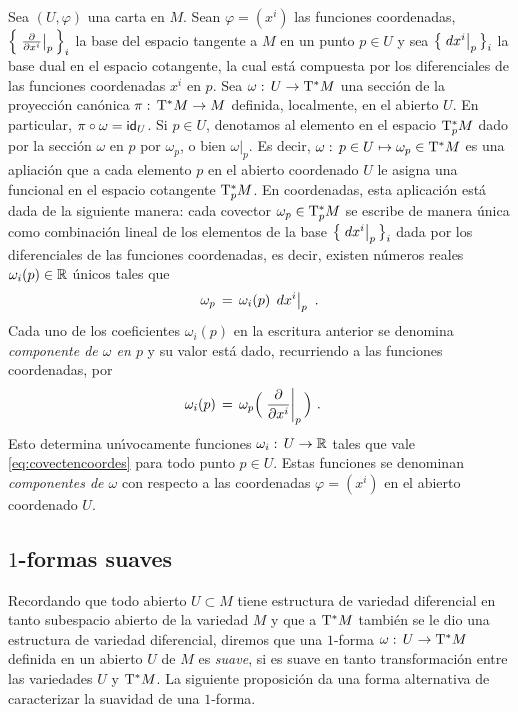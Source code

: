 Sea $(U,\varphi)$ una carta en $M$. Sean $\varphi=(x^{i})$ las funciones
coordenadas, $\Big\{\gancho[p]{x^{i}}\Big\}_{i}$ la base del espacio tangente
a $M$ en un punto $p\in U$ y sea $\big\{\de[p]{x^{i}}\big\}_{i}$ la base
dual en el espacio cotangente, la cual est\'{a} compuesta por los
diferenciales de las funciones coordenadas $x^{i}$ en $p$. Sea
$\omega:\,U\rightarrow\tangente*{M}$ una secci\'{o}n de la proyecci\'{o}n
can\'{o}nica $\pi:\,\tangente*{M}\rightarrow M$ definida, localmente,
en el abierto $U$. En particular, $\pi\circ\omega=\id[U]$. Si $p\in U$,
denotamos al elemento en el espacio $\tangente*[p]{M}$ dado por la
secci\'{o}n $\omega$ en $p$ por $\omega_{p}$, o bien $\omega|_{p}$.
Es decir, $\omega:\,p\in U\mapsto\omega_{p}\in\tangente*{M}$ es una
apliaci\'{o}n que a cada elemento $p$ en el abierto coordenado $U$ le
asigna una funcional en el espacio cotangente $\tangente*[p]{M}$.
En coordenadas, esta aplicaci\'{o}n est\'{a} dada de la siguiente manera:
cada covector $\omega_{p}\in\tangente*[p]{M}$ se escribe de manera \'{u}nica
como combinaci\'{o}n lineal de los elementos de la base
$\big\{\de[p]{x^{i}}\big\}_{i}$ dada por los diferenciales de las funciones
coordenadas, es decir, existen n\'{u}meros reales
$\omega_{i}(p)\in\bb{R}$ \'{u}nicos tales que
\begin{equation}
	\label{eq:covectencoordes}
	\omega_{p} \,=\,\omega_{i}(p)\,\de[p]{x^{i}}
	\text{ .}
\end{equation}
%
Cada uno de los coeficientes $\omega_{i}(p)$ en la escritura anterior
se denomina \emph{componente de $\omega$ en $p$} y su valor est\'{a} dado,
recurriendo a las funciones coordenadas, por
\begin{align*}
	\omega_{i}(p) & \,=\,\omega_{p}\Big(\gancho[p]{x^{i}}\Big)
	\text{ .}
\end{align*}
%
Esto determina un\'{\i}vocamente funciones $\omega_{i}:\,U\rightarrow\bb{R}$
tales que vale \eqref{eq:covectencoordes} para todo punto $p\in U$. Estas
funciones se denominan \emph{componentes de $\omega$} con respecto a
las coordenadas $\varphi=(x^{i})$ en el abierto coordenado $U$.

\subsection{$1$-formas suaves}
Recordando que todo abierto $U\subset M$ tiene estructura de variedad
diferencial en tanto subespacio abierto de la variedad $M$ y que a
$\tangente*{M}$ tambi\'{e}n se le dio una estructura de variedad diferencial,
diremos que una $1$-forma $\omega:\,U\rightarrow\tangente*{M}$ definida
en un abierto $U$ de $M$ es \emph{suave}, si es suave en tanto
transformaci\'{o}n entre las variedades $U$ y $\tangente*{M}$.
La siguiente proposici\'{o}n da una forma alternativa de caracterizar la
suavidad de una $1$-forma.

